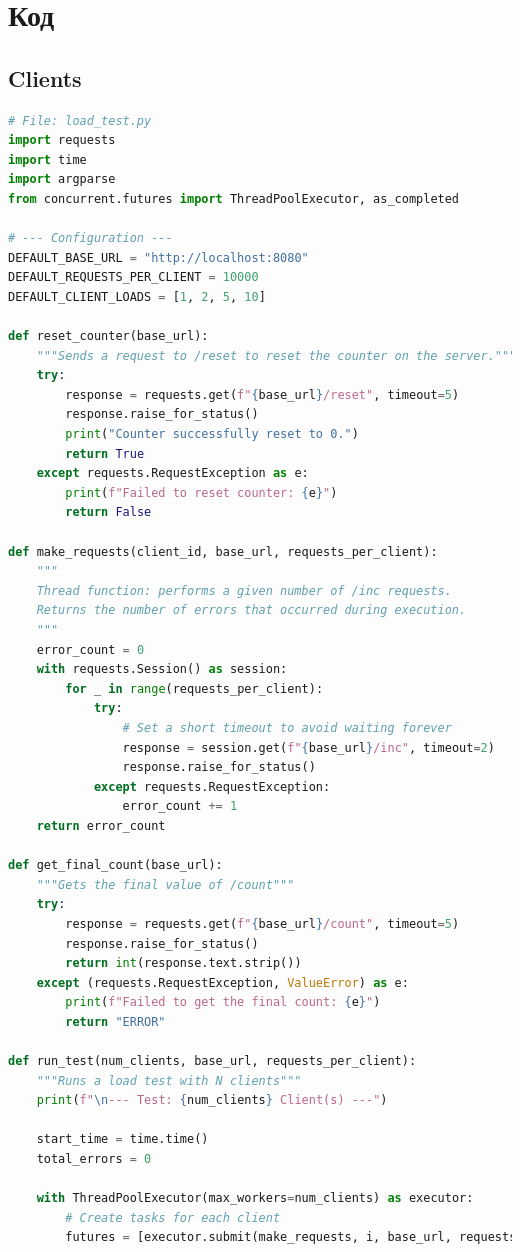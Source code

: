 \documentclass[12pt,a4paper]{article}
\begin{document}
\section{Код}
\subsection{Clients}
\begin{lstlisting}[language=Python]
# File: load_test.py
import requests
import time
import argparse
from concurrent.futures import ThreadPoolExecutor, as_completed

# --- Configuration ---
DEFAULT_BASE_URL = "http://localhost:8080"
DEFAULT_REQUESTS_PER_CLIENT = 10000
DEFAULT_CLIENT_LOADS = [1, 2, 5, 10]

def reset_counter(base_url):
    """Sends a request to /reset to reset the counter on the server."""
    try:
        response = requests.get(f"{base_url}/reset", timeout=5)
        response.raise_for_status()
        print("Counter successfully reset to 0.")
        return True
    except requests.RequestException as e:
        print(f"Failed to reset counter: {e}")
        return False

def make_requests(client_id, base_url, requests_per_client):
    """
    Thread function: performs a given number of /inc requests.
    Returns the number of errors that occurred during execution.
    """
    error_count = 0
    with requests.Session() as session:
        for _ in range(requests_per_client):
            try:
                # Set a short timeout to avoid waiting forever
                response = session.get(f"{base_url}/inc", timeout=2)
                response.raise_for_status()
            except requests.RequestException:
                error_count += 1
    return error_count

def get_final_count(base_url):
    """Gets the final value of /count"""
    try:
        response = requests.get(f"{base_url}/count", timeout=5)
        response.raise_for_status()
        return int(response.text.strip())
    except (requests.RequestException, ValueError) as e:
        print(f"Failed to get the final count: {e}")
        return "ERROR"

def run_test(num_clients, base_url, requests_per_client):
    """Runs a load test with N clients"""
    print(f"\n--- Test: {num_clients} Client(s) ---")
    
    start_time = time.time()
    total_errors = 0
    
    with ThreadPoolExecutor(max_workers=num_clients) as executor:
        # Create tasks for each client
        futures = [executor.submit(make_requests, i, base_url, requests_per_client) for i in range(num_clients)]
        

\end{lstlisting}
\end{document}
